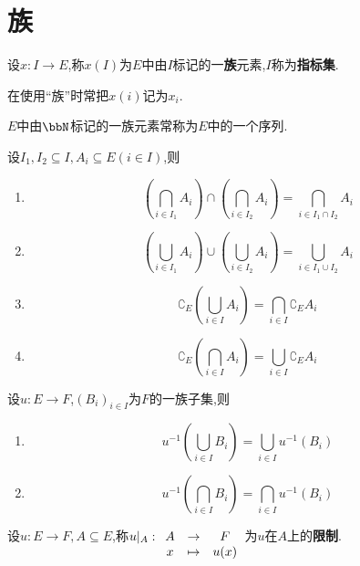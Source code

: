 \section{族}

\begin{prop}
    设$x: I \to E$,称$x(I)$为$E$中由$I$标记的一\textbf{族}元素,$I$称为\textbf{指标集}.
\end{prop}

\begin{rqq}
    在使用``族''时常把$x(i)$记为$x_i$.
\end{rqq}

\begin{rqq}
    $E$中由$\bbN$标记的一族元素常称为$E$中的一个序列.
\end{rqq}

\begin{deff}
    设$I_1, I_2 \subseteq I, A_i \subseteq E (i \in I)$,则
    \begin{enumerate}
        \item \[ \left( \bigcap\limits_{i \in I_1} A_i \right) \cap \left( \bigcap\limits_{i \in I_2} A_i \right) = \bigcap\limits_{i \in I_1 \cap I_2} A_i \]
        \item \[ \left( \bigcup\limits_{i \in I_1} A_i \right) \cup \left( \bigcup\limits_{i \in I_2} A_i \right) = \bigcup\limits_{i \in I_1 \cup I_2} A_i \]
        \item \[ \complement_E \left( \bigcup\limits_{i \in I} A_i \right) = \bigcap\limits_{i \in I} \complement_E A_i \]
        \item \[ \complement_E \left( \bigcap\limits_{i \in I} A_i \right) = \bigcup\limits_{i \in I} \complement_E A_i \]
    \end{enumerate}
\end{deff}

\begin{prop}
    设$u: E \to F$,$(B_i)_{i \in I}$为$F$的一族子集,则
    \begin{enumerate}
        \item \[ u^{-1} \left( \bigcup\limits_{i \in I} B_i \right) = \bigcup\limits_{i \in I} u^{-1}(B_i) \]
        \item \[ u^{-1} \left( \bigcap\limits_{i \in I} B_i \right) = \bigcap\limits_{i \in I} u^{-1}(B_i) \]
    \end{enumerate}
\end{prop}

\begin{deff}
    设$u: E \to F, A \subseteq E$,称$u \vert_A: \begin{array}[t]{ccc} A & \to & F \\ x & \mapsto & u(x) \end{array}$为$u$在$A$上的\textbf{限制}.
\end{deff}

